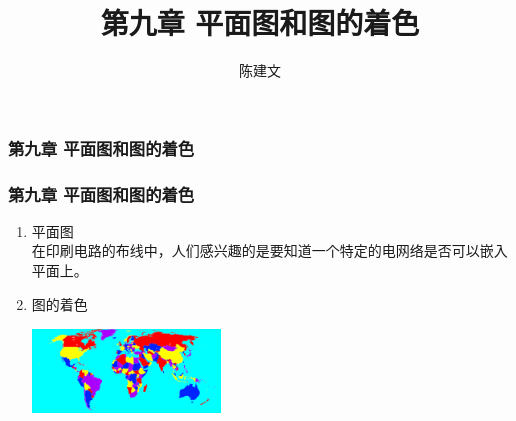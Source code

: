 \documentclass{beamer}
\begin{document}
\begin{CJK}{UTF8}{gbsn}
\newtheorem{definition9.1.1}{定义9.1.1}
\newtheorem{definition9.1.2}{定义9.1.2}
\newtheorem{theorem9.1.1}{定理9.1.1（欧拉公式）}
\newtheorem{corollary9.1.1}{推论9.1.1}
\newtheorem{corollary9.1.2}{推论9.1.2}
\newtheorem{corollary9.1.3}{推论9.1.3}
\newtheorem{corollary9.1.4}{推论9.1.4}
\newtheorem{corollary9.1.5}{推论9.1.5}
\newtheorem{corollary9.1.6}{推论9.1.6}
\newtheorem{theorem9.2.1}{定理9.2.1}
\newtheorem{definition9.3.1}{定义9.3.1}
\newtheorem{definition9.3.2}{定义9.3.2}
\newtheorem{definition9.3.3}{定义9.3.3}
\newtheorem{definition9.3.4}{定义9.3.4}
\newtheorem{theorem9.3.1}{定理9.3.1}
\newtheorem{theorem9.3.2}{定理9.3.2}
\newtheorem{definition9.4.1}{定义9.4.1}
\newtheorem{definition9.4.2}{定义9.4.2}
\newtheorem{theorem9.4.1}{定理9.4.1}
\newtheorem{theorem9.4.2}{定理9.4.2}
\newtheorem{theorem9.4.3}{定理9.4.3}
\newtheorem{theorem9.4.4}{定理9.4.4}
\newtheorem{theorem9.4.5}{定理9.4.5}
\newtheorem{theorem9.4.6}{定理9.4.6}
\newtheorem{exercise1}{习题1}
\newtheorem{exercise2}{习题2}
\newtheorem{exercise3}{习题3}
\newtheorem{exercise4}{习题4}
\newtheorem{exercise5}{习题5}
\newtheorem{Exercise}{习题}

\date{}
\author{陈建文}

\title{第九章 平面图和图的着色}
\begin{frame}
  \titlepage
  
\end{frame}
\begin{frame}
  \frametitle{第九章 平面图和图的着色}
\end{frame}

\begin{frame}
  \frametitle{第九章 平面图和图的着色}
  \begin{enumerate}
  \item 平面图\\
\pause
在印刷电路的布线中，人们感兴趣的是要知道一个特定的电网络是否可以嵌入平面上。
\pause
\item 图的着色\\
\pause
\includegraphics[width=5cm,height=3cm]{Worldmap}
  \end{enumerate}
\end{frame}


\end{CJK}
\end{document}

